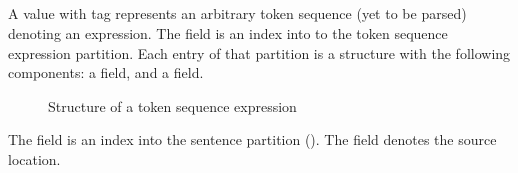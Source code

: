 




\subsection{}
\label{sec:ifc:ExprSort:Tokens}

A  value with tag  represents an arbitrary token sequence (yet to be parsed) denoting an expression. 
The  field is an index into to the token sequence expression partition.
Each entry of that partition is a structure with the following components: a  field, and a  field.
%
\begin{figure}[H]
	\centering
	\caption{Structure of a token sequence expression}
	\label{fig:ifc-token-sequence-expression-structure}
\end{figure}
%
The  field is an index into the sentence partition ().
The  field denotes the source location.

